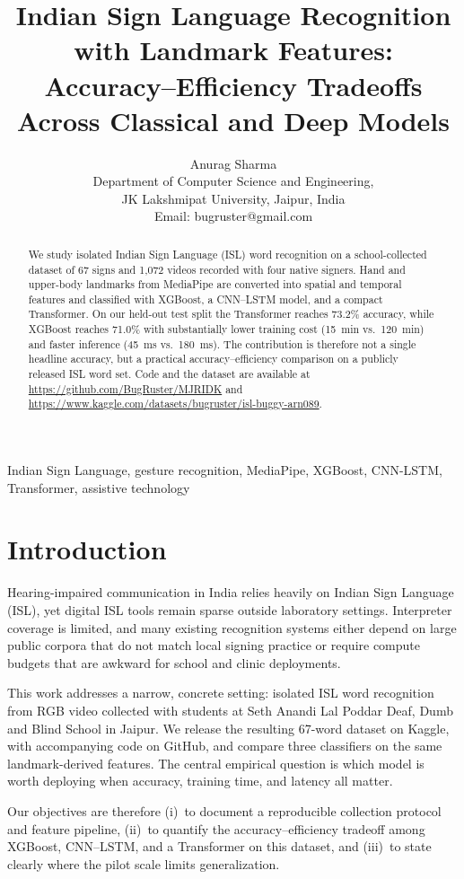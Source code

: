 \documentclass[conference]{IEEEtran}
\title{Indian Sign Language Recognition with Landmark Features:\\
Accuracy--Efficiency Tradeoffs Across Classical and Deep Models}
\author{Anurag Sharma\\
Department of Computer Science and Engineering,\\
JK Lakshmipat University, Jaipur, India\\
Email: bugruster@gmail.com}
\begin{document}
\maketitle

\begin{abstract}
We study isolated Indian Sign Language (ISL) word recognition on a school-collected dataset of 67 signs and 1{,}072 videos recorded with four native signers. Hand and upper-body landmarks from MediaPipe are converted into spatial and temporal features and classified with XGBoost, a CNN--LSTM model, and a compact Transformer. On our held-out test split the Transformer reaches 73.2\% accuracy, while XGBoost reaches 71.0\% with substantially lower training cost (15~min vs.\ 120~min) and faster inference (45~ms vs.\ 180~ms). The contribution is therefore not a single headline accuracy, but a practical accuracy--efficiency comparison on a publicly released ISL word set. Code and the dataset are available at \url{https://github.com/BugRuster/MJRIDK} and \url{https://www.kaggle.com/datasets/bugruster/isl-buggy-arn089}.
\end{abstract}

\begin{IEEEkeywords}
Indian Sign Language, gesture recognition, MediaPipe, XGBoost, CNN-LSTM, Transformer, assistive technology
\end{IEEEkeywords}

\section{Introduction}
Hearing-impaired communication in India relies heavily on Indian Sign Language (ISL), yet digital ISL tools remain sparse outside laboratory settings. Interpreter coverage is limited, and many existing recognition systems either depend on large public corpora that do not match local signing practice or require compute budgets that are awkward for school and clinic deployments.

This work addresses a narrow, concrete setting: isolated ISL word recognition from RGB video collected with students at Seth Anandi Lal Poddar Deaf, Dumb and Blind School in Jaipur. We release the resulting 67-word dataset on Kaggle, with accompanying code on GitHub, and compare three classifiers on the same landmark-derived features. The central empirical question is which model is worth deploying when accuracy, training time, and latency all matter.

Our objectives are therefore (i)~to document a reproducible collection protocol and feature pipeline, (ii)~to quantify the accuracy--efficiency tradeoff among XGBoost, CNN--LSTM, and a Transformer on this dataset, and (iii)~to state clearly where the pilot scale limits generalization.
\end{document}
